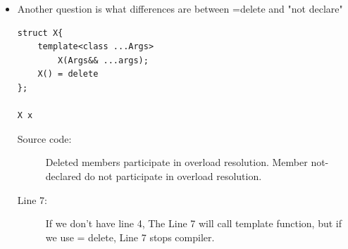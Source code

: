 \documentclass[a4paper,11pt,twoside]{book}
\begin{document}
\begin{itemize}
	\item Another question is what differences are between =delete and "not declare"
\begin{lstlisting}
struct X{
	template<class ...Args>
		X(Args&& ...args);
	X() = delete
};

X x 
\end{lstlisting}
\begin{description}
	\item[Source code:] Deleted members participate in overload resolution. Member not-declared do not participate in overload resolution.	
	\item[Line 7:] If we don't have line 4, The Line 7 will call template function, but if we use = delete, Line 7 stops compiler.  
\end{description}


\end{itemize}
\end{document}
